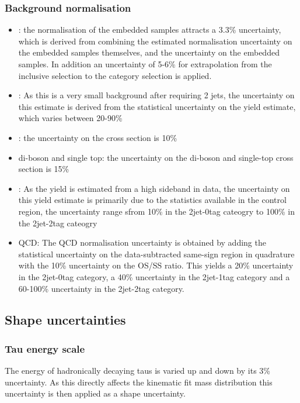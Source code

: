 \subsubsection*{Background normalisation}
\begin{itemize}
\item \Ztautau : the normalisation of the embedded samples attracts a 3.3\% uncertainty, which is derived
from combining the estimated normalisation uncertainty on the embedded samples themselves, and the uncertainty on the \ttbar embedded samples. In addition an uncertainty of 5-6\% for extrapolation from the inclusive selection to the category selection is applied.
\item \Zellell: As this is a very small background after requiring 2 jets, the uncertainty on this estimate is derived from the statistical uncertainty on the yield estimate, which varies between 20-90\%
\item \ttbar: the uncertainty on the \ttbar cross section is 10\%
\item di-boson and single top: the uncertainty on the di-boson and single-top cross section is 15\%
\item \Wjets: As the \Wjets yield is estimated from a high \mT sideband in data, the uncertainty on this yield estimate is primarily due to the statistics available in the control region, the uncertainty range sfrom 10\% in the 2jet-0tag cateogry to 100\% in the 2jet-2tag cateogry
\item QCD: The QCD normalisation uncertainty is obtained by adding the statistical uncertainty on the data-subtracted same-sign region in quadrature with the 10\% uncertainty on the OS/SS ratio. This yields a 20\% uncertainty in the 2jet-0tag category, a 40\% uncertainty in the 2jet-1tag category and a 60-100\% uncertainty in the 2jet-2tag category.
\end{itemize}

\subsection{Shape uncertainties}
\label{sec:hhh_uncerts_shape}

\subsubsection*{Tau energy scale}
The energy of hadronically decaying taus is varied up and down by its 3\% uncertainty. As this directly affects the kinematic fit mass distribution this uncertainty is then applied as a shape uncertainty.

